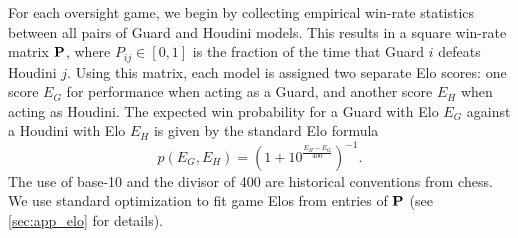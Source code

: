 \documentclass{article}
\begin{document}
For each oversight game, we begin by collecting empirical win-rate statistics between all pairs of Guard and Houdini models. 
This results in a square win-rate matrix $\P$, where $P_{ij}\in[0,1]$ is the fraction of the time that Guard $i$ defeats Houdini $j$. 
Using this matrix, each model is assigned two separate Elo \citep{elo1967proposed} scores: one score $E_G$ for performance when acting as a Guard, and another score $E_H$ when acting as Houdini. The expected win probability for a Guard with Elo $E_G$ against a Houdini with Elo $E_H$ is given by the standard Elo formula
\begin{equation}
p(E_G, E_H) = \left(1 + 10^{\frac{E_H - E_G}{400}}\right)^{-1}. 
\label{eq:elo} 
\end{equation}
The use of base-10 and the divisor of 400 are historical conventions from chess. We use standard optimization to fit game Elos from entries of $\P$ (see \cref{sec:app_elo} for details).







\end{document}
